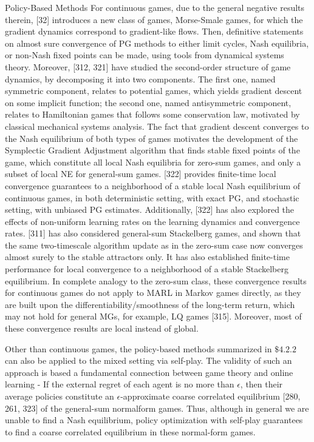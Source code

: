 \documentclass[10pt]{article}
\begin{document}
Policy-Based Methods For continuous games, due to the general negative results therein, [32] introduces a new class of games, Morse-Smale games, for which the gradient dynamics correspond to gradient-like flows. Then, definitive statements on almost sure convergence of PG methods to either limit cycles, Nash equilibria, or non-Nash fixed points can be made, using tools from dynamical systems theory. Moreover, [312, 321] have studied the second-order structure of game dynamics, by decomposing it into two components. The first one, named symmetric component, relates to potential games, which yields gradient descent on some implicit function; the second one, named antisymmetric component, relates to Hamiltonian games that follows some conservation law, motivated by classical mechanical systems analysis. The fact that gradient descent converges to the Nash equilibrium of both types of games motivates the development of the Symplectic Gradient Adjustment algorithm that finds stable fixed points of the game, which constitute all local Nash equilibria for zero-sum games, and only a subset of local NE for general-sum games. [322] provides finite-time local convergence guarantees to a neighborhood of a stable local Nash equilibrium of continuous games, in both deterministic setting, with exact PG, and stochastic setting, with unbiased PG estimates. Additionally, [322] has also explored the effects of non-uniform learning rates on the learning dynamics and convergence rates. [311] has also considered general-sum Stackelberg games, and shown that the same two-timescale algorithm update as in the zero-sum case now converges almost surely to the stable attractors only. It has also established finite-time performance for local convergence to a neighborhood of a stable Stackelberg equilibrium. In complete analogy to the zero-sum class, these convergence results for continuous games do not apply to MARL in Markov games directly, as they are built upon the differentiability/smoothness of the long-term return, which may not hold for general MGs, for example, LQ games [315]. Moreover, most of these convergence results are local instead of global.

Other than continuous games, the policy-based methods summarized in $\$ 4.2 .2$ can also be applied to the mixed setting via self-play. The validity of such an approach is based a fundamental connection between game theory and online learning - If the external regret of each agent is no more than $\epsilon$, then their average policies constitute an $\epsilon$-approximate coarse correlated equilibrium [280, 261, 323] of the general-sum normalform games. Thus, although in general we are unable to find a Nash equilibrium, policy optimization with self-play guarantees to find a coarse correlated equilibrium in these normal-form games.
\end{document}
